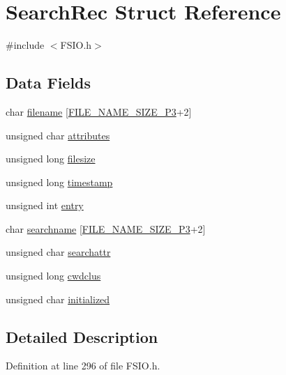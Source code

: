 \hypertarget{struct_search_rec}{}\section{Search\+Rec Struct Reference}
\label{struct_search_rec}


{\ttfamily \#include $<$F\+S\+I\+O.\+h$>$}

\subsection*{Data Fields}
\begin{DoxyCompactItemize}
\item 
char \hyperlink{struct_search_rec_a65e5ed58ca2b728f26a9b3b905f0c105}{filename} \mbox{[}\hyperlink{_f_s_i_o_8h_a8736a0b15f6c3942599baa3a0bae6b11}{F\+I\+L\+E\+\_\+\+N\+A\+M\+E\+\_\+\+S\+I\+Z\+E\+\_\+P3}+2\mbox{]}
\item 
unsigned char \hyperlink{struct_search_rec_aaae4ca8334d09f071d51cc989a155dad}{attributes}
\item 
unsigned long \hyperlink{struct_search_rec_a4c1b7deef43839b86d8a5616ee5428f0}{filesize}
\item 
unsigned long \hyperlink{struct_search_rec_acba7776dcc1861edfe0e9c5736de4df8}{timestamp}
\item 
unsigned int \hyperlink{struct_search_rec_acd77462c0a6a72f327690ed0d920a989}{entry}
\item 
char \hyperlink{struct_search_rec_a28187bee5f714a63792bc50d7ff52366}{searchname} \mbox{[}\hyperlink{_f_s_i_o_8h_a8736a0b15f6c3942599baa3a0bae6b11}{F\+I\+L\+E\+\_\+\+N\+A\+M\+E\+\_\+\+S\+I\+Z\+E\+\_\+P3}+2\mbox{]}
\item 
unsigned char \hyperlink{struct_search_rec_a399bc05b4953e50a5e787f3df4712ac0}{searchattr}
\item 
unsigned long \hyperlink{struct_search_rec_af66188f74bf17490aa008ec9c99bb12e}{cwdclus}
\item 
unsigned char \hyperlink{struct_search_rec_ac1e2012077affd3af36e62437d68fa8b}{initialized}
\end{DoxyCompactItemize}


\subsection{Detailed Description}


Definition at line 296 of file F\+S\+I\+O.\+h.



